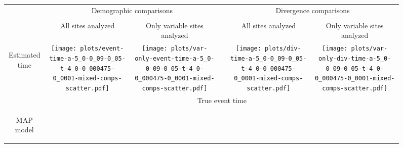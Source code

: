 \documentclass[border=10pt,varwidth=30cm]{standalone}
\begin{document}
\begin{figure}
    \centering
    \begin{tabular}{@{}cccccc@{}}
        & \multicolumn{2}{c}{\LARGE Demographic comparisons}
        &
        & \multicolumn{2}{c}{\LARGE Divergence comparisons} \\[1ex]
        \cline{2-3}\cline{5-6}
        & & & & & \\
        & \multirow{1}{0.15\textwidth}{\Large\centering All sites analyzed}
        & \multirow{1}{0.15\textwidth}{\Large\centering Only variable sites analyzed}
        &
        & \multirow{1}{0.15\textwidth}{\Large\centering All sites analyzed}
        & \multirow{1}{0.15\textwidth}{\Large\centering Only variable sites analyzed} \\[5ex]
        \multirow{1}{*}[8em]{\begin{sideways}\large Estimated time\end{sideways}}
        & \texttt{[image: plots/event-time-a-5\_0-0\_09-0\_05-t-4\_0-0\_000475-0\_0001-mixed-comps-scatter.pdf]}
        & \texttt{[image: plots/var-only-event-time-a-5\_0-0\_09-0\_05-t-4\_0-0\_000475-0\_0001-mixed-comps-scatter.pdf]}
        &
        & \texttt{[image: plots/div-time-a-5\_0-0\_09-0\_05-t-4\_0-0\_000475-0\_0001-mixed-comps-scatter.pdf]}
        & \texttt{[image: plots/var-only-div-time-a-5\_0-0\_09-0\_05-t-4\_0-0\_000475-0\_0001-mixed-comps-scatter.pdf]} \\
        & \multicolumn{5}{c}{\large True event time} \\
        \multirow{1}{*}[7.5em]{\begin{sideways}\large MAP model\end{sideways}}

\end{tabular}
\end{figure}
\end{document}
